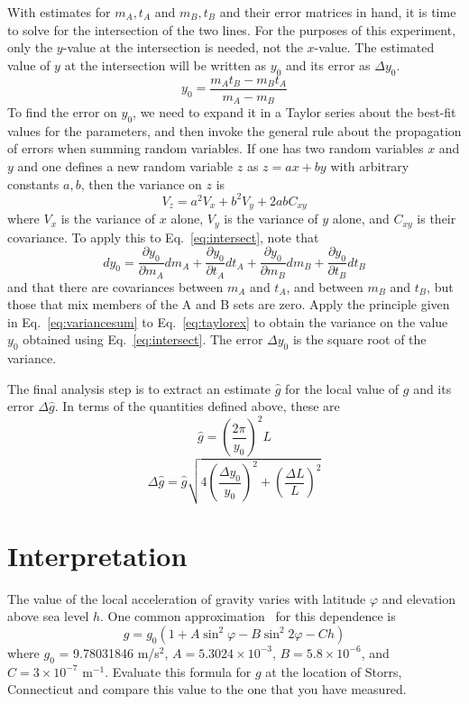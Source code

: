 \documentclass{revtex4}
\begin{document}
With estimates for $m_A,t_A$ and $m_B,t_B$ and their error matrices in hand,
it is time to solve for the intersection of the two lines.  For the purposes
of this experiment, only the $y$-value at the intersection is needed, not the
$x$-value.  The estimated value of $y$ at the intersection will be written
as $y_0$ and its error as $\Delta y_0$.
\begin{equation}
y_0 = \frac{m_At_B-m_Bt_A}{m_A-m_B} \label{eq:intersect}
\end{equation}
To find the error on $y_0$, we need to expand it in a Taylor series about
the best-fit values for the parameters, and then invoke the general rule
about the propagation of errors when summing random variables.  If one has
two random variables $x$ and $y$ and one defines a new random variable $z$
as $z=ax+by$ with arbitrary constants $a,b$, then the variance on $z$ is
\begin{equation}
V_z = a^2 V_x + b^2 V_y + 2ab C_{xy}
\label{eq:variancesum}
\end{equation}
where $V_x$ is the variance of $x$ alone, $V_y$ is the variance of $y$ alone,
and $C_{xy}$ is their covariance.  To apply this to Eq.~\ref{eq:intersect},
note that
\begin{equation}
dy_0 = \frac{\partial y_0}{\partial m_A} dm_A +
\frac{\partial y_0}{\partial t_A} dt_A +
\frac{\partial y_0}{\partial m_B} dm_B +
\frac{\partial y_0}{\partial t_B} dt_B
\label{eq:taylorex}
\end{equation}
and that there are covariances between $m_A$ and $t_A$, and between
$m_B$ and $t_B$, but those that mix members of the A and B sets are zero.
Apply the principle given in Eq.~\ref{eq:variancesum} to Eq.~\ref{eq:taylorex}
to obtain the variance on the value $y_0$ obtained using
Eq.~\ref{eq:intersect}.  The error $\Delta y_0$ is the square root of
the variance.

The final analysis step is to extract an estimate $\hat{g}$ for the local
value of $g$ and its error $\Delta \hat{g}$.  In terms of the quantities
defined above, these are
\begin{equation}
\hat{g} = \left(\frac{2\pi}{y_0}\right)^2L
\end{equation}
\begin{equation}
\Delta \hat{g} = \hat{g}\sqrt{4\left(\frac{\Delta y_0}{y_0}\right)^2
+\left(\frac{\Delta L}{L}\right)^2}
\end{equation}

\section{Interpretation}
The value of the local acceleration of gravity varies with
latitude $\varphi$ and elevation above sea level $h$.  One common
approximation~\cite{Heiskanen67,Geodesy71} for this dependence is
\begin{equation}
g = g_0\left(1 + A\sin^2{\varphi} - B\sin^2{2\varphi} - Ch\right)
\end{equation}
where $g_0$ = 9.78031846 m/s$^2$, $A = 5.3024\times 10^{-3}$, 
$B = 5.8\times 10^{-6}$, and $C = 3\times 10^{-7}$ m$^{-1}$.
Evaluate this formula for $g$ at the location of Storrs, Connecticut and
compare this value to the one that you have measured.
\end{document}
